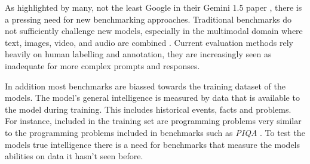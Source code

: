 As highlighted by many, not the least Google in their Gemini 1.5 paper \cite{gemini_team_gemini_2024}, there is a pressing need for new benchmarking approaches. Traditional benchmarks do not sufficiently challenge new models, especially in the multimodal domain where text, images, video, and audio are combined \cite{gemini_team_gemini_2024}. Current evaluation methods rely heavily on human labelling and annotation, they are  increasingly seen as inadequate for more complex prompts and responses.


In addition most benchmarks are biassed towards the training dataset of the models. The model's general intelligence is measured by data that is available to the model during training. This includes historical events, facts and problems. For instance, included in the training set are programming problems very similar to the programming problems included in benchmarks such as \textit{PIQA} \cite{bisk_piqa_2019-1}. To test the models true intelligence there is a need for benchmarks that measure the models abilities on data it hasn’t seen before.










\cleardoublepage
